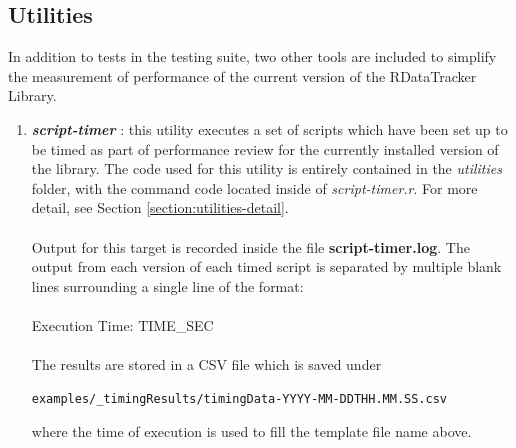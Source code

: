 \documentclass[12pt]{article}
\begin{document}
\subsection{Utilities}
In addition to tests in the testing suite, two other tools are included to simplify the measurement of performance of the current version of the RDataTracker Library. 
\begin{enumerate}
\item \textbf{\textit{script-timer}} : this utility executes a set of scripts which have been set up to be timed as part of performance review for the currently installed version of the library.  The code used for this utility is entirely contained in the \textit{utilities} folder, with the command code located inside of \textit{script-timer.r}. For more detail, see Section \ref{section:utilities-detail}.\\\\
Output for this target is recorded inside the file \textbf{script-timer.log}. The output from each version of each timed script is separated by multiple blank lines surrounding a single line of the format: \\\\
Execution Time: TIME\_SEC \\\\
The results are stored in a CSV file which is saved under
\begin{lstlisting}
examples/_timingResults/timingData-YYYY-MM-DDTHH.MM.SS.csv
\end{lstlisting}
where the time of execution is used to fill the template file name above.
 

\end{enumerate}
\end{document}
